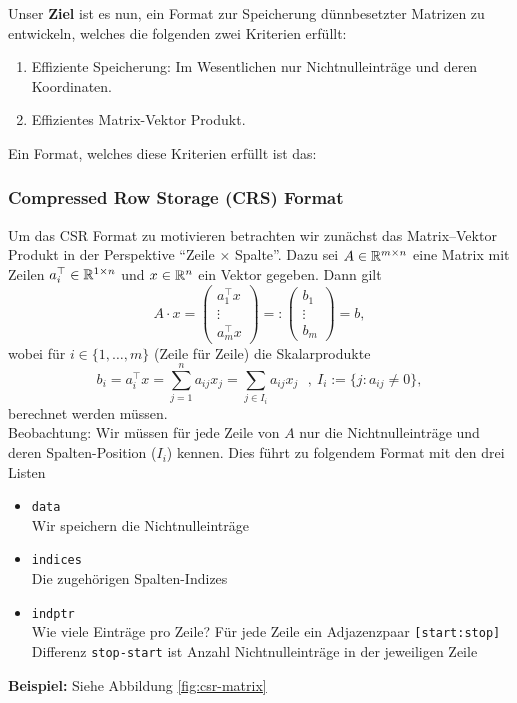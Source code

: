 Unser \textbf{Ziel} ist es nun, ein Format zur Speicherung dünnbesetzter Matrizen zu entwickeln, welches die folgenden zwei Kriterien erfüllt:
\begin{enumerate}
	\item Effiziente Speicherung: Im Wesentlichen nur Nichtnulleinträge und deren Koordinaten.
	\item Effizientes Matrix-Vektor Produkt.
\end{enumerate}
Ein Format, welches diese Kriterien erfüllt ist das:
\subsubsection{Compressed Row Storage (CRS) Format}
Um das CSR Format zu motivieren betrachten wir zunächst das Matrix--Vektor Produkt in der Perspektive ``Zeile $\times$ Spalte''. Dazu sei $A \in {\mathbb{R}}^{m\times n}$ eine Matrix mit Zeilen $a_i^\top \in {\mathbb{R}}^{1 \times n}$ und $x \in {\mathbb{R}}^{n}$ ein Vektor gegeben. Dann gilt
$$A\cdot x =  \begin{pmatrix}
a_1^\top x \\ \vdots \\a_m^\top x
\end{pmatrix} =:\begin{pmatrix}
b_1  \\ \vdots \\b_m
\end{pmatrix}= b,$$
wobei für $i \in \{1,\ldots, m\}$ (Zeile für Zeile) die Skalarprodukte
$$b_i = a_i^\top x = \sum_{j=1}^n a_{ij} x_j = \sum_{j \in I_i} a_{ij}x_j ~~~,~I_i := \{j: a_{ij} \neq 0\},$$
berechnet werden müssen.\\
Beobachtung: Wir müssen für jede Zeile von $A$ nur die Nichtnulleinträge und deren Spalten-Position ($I_i$) kennen. Dies führt zu folgendem Format mit den drei Listen
\begin{itemize}
	\item \texttt{data}\\
	Wir speichern die Nichtnulleinträge
	\item \texttt{indices}\\
	Die zugehörigen Spalten-Indizes
	\item \texttt{indptr}\\
	Wie viele Einträge pro Zeile? Für jede Zeile ein Adjazenzpaar \texttt{[start:stop]} \\
	 Differenz \texttt{stop-start} ist Anzahl Nichtnulleinträge in der jeweiligen Zeile
\end{itemize}
\textbf{Beispiel:} Siehe Abbildung \ref{fig:csr-matrix}
